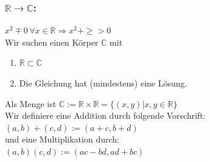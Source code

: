 \subsubsection{$\mathbb{R}\rightarrow\mathbb{C}$:}
$x^{2}\mp 0 \, \forall x\in\mathbb{R}\Rightarrow x^{2}+\geq>0$\\
Wir suchen einen Körper $\mathbb{C}$ mit 
\begin{enumerate}
	\item $\mathbb{R}\subset\mathbb{C}$
	\item Die Gleichung hat (mindestens) eine Lösung.
\end{enumerate}
Als Menge ist $\mathbb{C}:=\mathbb{R}\times\mathbb{R}=\{(x,y)|x,y\in\mathbb{R}\}$\\
Wir definiere eine Addition durch folgende Vorschrift:\\
$(a,b)+(c,d):=(a+c,b+d)$\\
und eine Multiplikation durch:\\
$(a,b)(c,d):=(ac-bd,ad+bc)$
%
%
%
